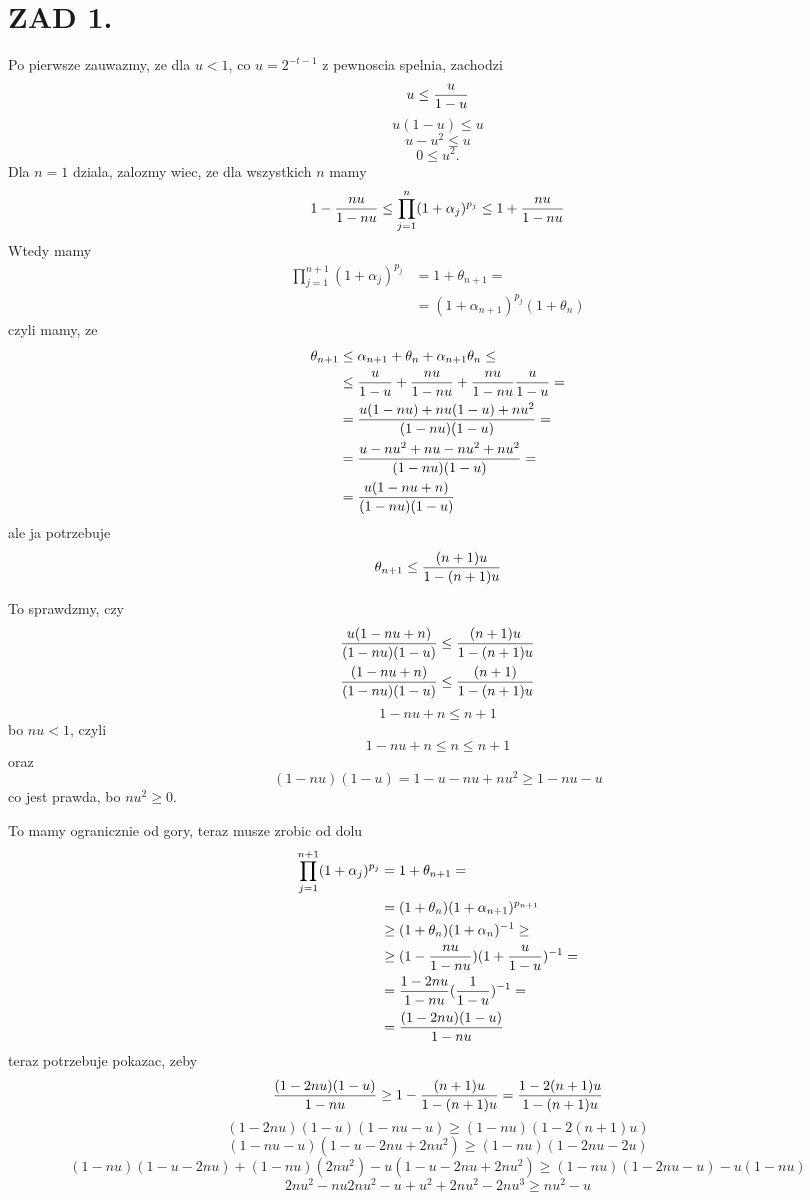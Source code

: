 \documentclass{article}[13pt]
\begin{document}
    \section*{ZAD 1.}
    Po pierwsze zauwazmy, ze dla $u<1$, co $u=2^{-t-1}$ z pewnoscia spelnia, zachodzi
    $$u\leq {u\over 1-u}$$
    $$u(1-u)\leq u$$
    $$u-u^2\leq u$$
    $$0\leq u^2.$$
    Dla $n=1$ dziala, zalozmy wiec, ze dla wszystkich $n$ mamy
    $$1-{nu\over 1-nu}\leq\prod\limits_{j=1}^n(1+\alpha_j)^{p_j}\leq 1+{nu\over 1-nu}$$
    Wtedy mamy
    \begin{align*}
        \prod\limits_{j=1}^{n+1}(1+\alpha_j)^{p_j}&=1+\theta_{n+1}=\\
        &=(1+\alpha_{n+1})^{p_j}(1+\theta_n)
    \end{align*}
    czyli mamy, ze 
    \begin{align*}
        \theta_{n+1}&\leq\alpha_{n+1}+\theta_n+\alpha_{n+1}\theta_n\leq\\
        &\leq {u\over 1-u}+{nu\over 1-nu}+{nu\over1-nu}{u\over 1-u}=\\
        &={u(1-nu)+nu(1-u)+nu^2\over (1-nu)(1-u)}=\\
        &={u-nu^2+nu-nu^2+nu^2\over (1-nu)(1-u)}=\\
        &={u(1-nu+n)\over (1-nu)(1-u)}
    \end{align*}
    ale ja potrzebuje
    $$\theta_{n+1}\leq {(n+1)u\over 1-(n+1)u}$$

    To sprawdzmy, czy
    \begin{align*}
        {u(1-nu+n)\over (1-nu)(1-u)}&\leq{(n+1)u\over 1-(n+1)u}\\
        {(1-nu+n)\over (1-nu)(1-u)}&\leq{(n+1)\over 1-(n+1)u}\\
    \end{align*}
    $$1-nu+n\leq n+1$$
    bo $nu<1$, czyli
    $$1-nu+n\leq n\leq n+1$$
    oraz
    $$(1-nu)(1-u)=1-u-nu+nu^2\geq 1-nu-u$$
    co jest prawda, bo $nu^2\geq 0$.
    \medskip

    To mamy ogranicznie od gory, teraz musze zrobic od dolu
    \begin{align*}
        \prod\limits_{j=1}^{n+1}(1+\alpha_j)^{p_j}&=1+\theta_{n+1}=\\
        &=(1+\theta_n)(1+\alpha_{n+1})^{p_{n+1}}\\
        &\geq(1+\theta_n)(1+\alpha_{n})^{-1}\geq\\
        &\geq(1-{nu\over 1-nu})(1+{u\over 1-u})^{-1}=\\
        &={1-2nu\over 1-nu}({1\over 1-u})^{-1}=\\
        &={(1-2nu)(1-u)\over 1-nu}
    \end{align*}
    teraz potrzebuje pokazac, zeby
    $${(1-2nu)(1-u)\over 1-nu}\geq 1-{(n+1)u\over{1-(n+1)u}}={1-2(n+1)u\over 1-(n+1)u}$$
    $$(1-2nu)(1-u)(1-nu-u)\geq (1-nu)(1-2(n+1)u)$$
    $$(1-nu-u)(1-u-2nu+2nu^2)\geq (1-nu)(1-2nu-2u)$$
    $$(1-nu)(1-u-2nu) + (1-nu)(2nu^2)-u(1-u-2nu+2nu^2)\geq(1-nu)(1-2nu-u) - u(1-nu)$$
    $$2nu^2-nu2nu^2-u+u^2+2nu^2-2nu^3\geq nu^2-u$$
    
\end{document}
